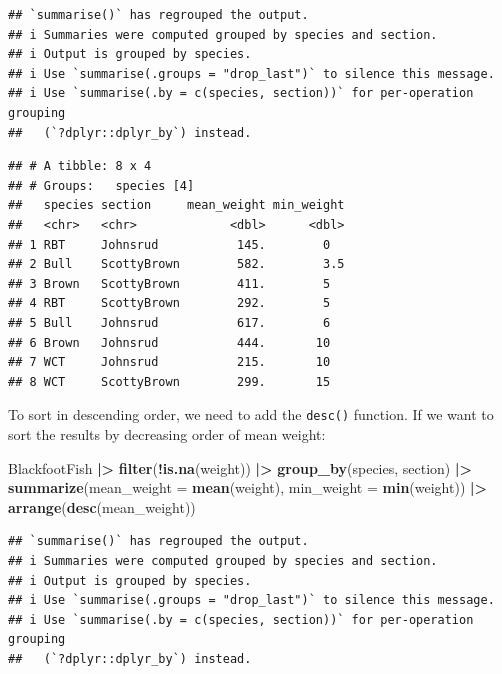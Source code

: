 \documentclass[
  10pt,
  letterpaper,
  twoside,
  openright]{book}
\newenvironment{Shaded}{\begin{snugshade}}{\end{snugshade}}
\newcommand{\AttributeTok}[1]{\textcolor[rgb]{0.13,0.29,0.53}{#1}}
\newcommand{\FunctionTok}[1]{\textcolor[rgb]{0.13,0.29,0.53}{\textbf{#1}}}
\newcommand{\NormalTok}[1]{#1}
\newcommand{\SpecialCharTok}[1]{\textcolor[rgb]{0.81,0.36,0.00}{\textbf{#1}}}
\begin{document}
\begin{verbatim}
## `summarise()` has regrouped the output.
## i Summaries were computed grouped by species and section.
## i Output is grouped by species.
## i Use `summarise(.groups = "drop_last")` to silence this message.
## i Use `summarise(.by = c(species, section))` for per-operation grouping
##   (`?dplyr::dplyr_by`) instead.
\end{verbatim}

\begin{verbatim}
## # A tibble: 8 x 4
## # Groups:   species [4]
##   species section     mean_weight min_weight
##   <chr>   <chr>             <dbl>      <dbl>
## 1 RBT     Johnsrud           145.        0  
## 2 Bull    ScottyBrown        582.        3.5
## 3 Brown   ScottyBrown        411.        5  
## 4 RBT     ScottyBrown        292.        5  
## 5 Bull    Johnsrud           617.        6  
## 6 Brown   Johnsrud           444.       10  
## 7 WCT     Johnsrud           215.       10  
## 8 WCT     ScottyBrown        299.       15
\end{verbatim}

To sort in descending order, we need to add the \texttt{desc()}
function. If we want to sort the results by decreasing order of mean
weight:

\begin{Shaded}
\begin{Highlighting}[]
\NormalTok{BlackfootFish }\SpecialCharTok{|\textgreater{}}
  \FunctionTok{filter}\NormalTok{(}\SpecialCharTok{!}\FunctionTok{is.na}\NormalTok{(weight)) }\SpecialCharTok{|\textgreater{}}
  \FunctionTok{group\_by}\NormalTok{(species, section) }\SpecialCharTok{|\textgreater{}}
  \FunctionTok{summarize}\NormalTok{(}\AttributeTok{mean\_weight =} \FunctionTok{mean}\NormalTok{(weight),}
            \AttributeTok{min\_weight =} \FunctionTok{min}\NormalTok{(weight)) }\SpecialCharTok{|\textgreater{}}
  \FunctionTok{arrange}\NormalTok{(}\FunctionTok{desc}\NormalTok{(mean\_weight))}
\end{Highlighting}
\end{Shaded}

\begin{verbatim}
## `summarise()` has regrouped the output.
## i Summaries were computed grouped by species and section.
## i Output is grouped by species.
## i Use `summarise(.groups = "drop_last")` to silence this message.
## i Use `summarise(.by = c(species, section))` for per-operation grouping
##   (`?dplyr::dplyr_by`) instead.
\end{verbatim}
\end{document}
